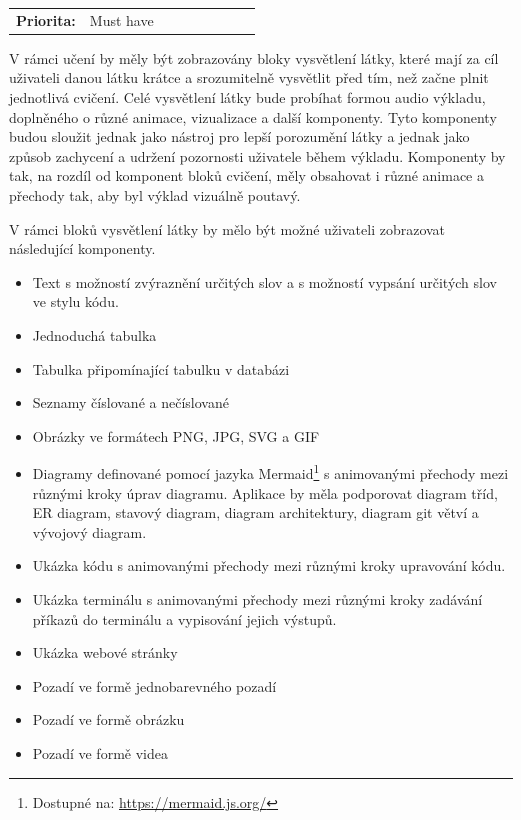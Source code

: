 \begin{tabular}{lp{0.7\linewidth}}
    \textbf{Priorita:} & Must have \\
\end{tabular}

V rámci učení by měly být zobrazovány bloky vysvětlení látky, které mají za cíl uživateli danou látku krátce a srozumitelně vysvětlit před tím, než začne plnit jednotlivá cvičení. Celé vysvětlení látky bude probíhat formou audio výkladu, doplněného o různé animace, vizualizace a další komponenty. Tyto komponenty budou sloužit jednak jako nástroj pro lepší porozumění látky a jednak jako způsob zachycení a udržení pozornosti uživatele během výkladu. Komponenty by tak, na rozdíl od komponent bloků cvičení, měly obsahovat i různé animace a přechody tak, aby byl výklad vizuálně poutavý.

V rámci bloků vysvětlení látky by mělo být možné uživateli zobrazovat následující komponenty.

\begin{itemize}
    \item Text s možností zvýraznění určitých slov a s možností vypsání určitých slov ve stylu kódu. %
    \item Jednoduchá tabulka %
    \item Tabulka připomínající tabulku v databázi %
    \item Seznamy číslované a nečíslované %
    \item Obrázky ve formátech PNG, JPG, SVG a GIF %
    \item Diagramy definované pomocí jazyka Mermaid\footnote{Dostupné na: \href{https://mermaid.js.org/}{https://mermaid.js.org/}} s animovanými přechody mezi různými kroky úprav diagramu. Aplikace by měla podporovat diagram tříd, ER diagram, stavový diagram, diagram architektury, diagram git větví a vývojový diagram. %
    \item Ukázka kódu s animovanými přechody mezi různými kroky upravování kódu. %
    \item Ukázka terminálu s animovanými přechody mezi různými kroky zadávání příkazů do terminálu a vypisování jejich výstupů. %
    \item Ukázka webové stránky %
    \item Pozadí ve formě jednobarevného pozadí %
    \item Pozadí ve formě obrázku %
    \item Pozadí ve formě videa %
\end{itemize}

